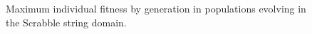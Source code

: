 \begin{figure}
  \caption{Maximum individual fitness by generation in populations evolving in the Scrabble string domain.}
  \label{fig:scrabble_fit_vs_gen}
\end{figure}
